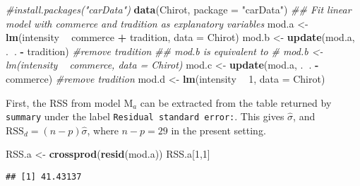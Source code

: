 \documentclass[]{book}
\newenvironment{Shaded}{\begin{snugshade}}{\end{snugshade}}
\newcommand{\CommentTok}[1]{\textcolor[rgb]{0.56,0.35,0.01}{\textit{#1}}}
\newcommand{\DataTypeTok}[1]{\textcolor[rgb]{0.13,0.29,0.53}{#1}}
\newcommand{\DecValTok}[1]{\textcolor[rgb]{0.00,0.00,0.81}{#1}}
\newcommand{\KeywordTok}[1]{\textcolor[rgb]{0.13,0.29,0.53}{\textbf{#1}}}
\newcommand{\NormalTok}[1]{#1}
\newcommand{\OperatorTok}[1]{\textcolor[rgb]{0.81,0.36,0.00}{\textbf{#1}}}
\newcommand{\StringTok}[1]{\textcolor[rgb]{0.31,0.60,0.02}{#1}}
\theoremstyle{definition}
\theoremstyle{definition}
\theoremstyle{definition}
\theoremstyle{remark}
\begin{document}
\begin{Shaded}
\begin{Highlighting}[]
\CommentTok{#install.packages("carData")}
\KeywordTok{data}\NormalTok{(Chirot, }\DataTypeTok{package =} \StringTok{"carData"}\NormalTok{)}
\CommentTok{## Fit linear model with commerce and tradition as explanatory variables}
\NormalTok{mod.a <-}\StringTok{ }\KeywordTok{lm}\NormalTok{(intensity }\OperatorTok{~}\StringTok{ }\NormalTok{commerce }\OperatorTok{+}\StringTok{ }\NormalTok{tradition, }\DataTypeTok{data =}\NormalTok{ Chirot)}
\NormalTok{mod.b <-}\StringTok{ }\KeywordTok{update}\NormalTok{(mod.a, .}\OperatorTok{~}\NormalTok{. }\OperatorTok{-}\StringTok{ }\NormalTok{tradition)  }\CommentTok{#remove tradition}
\CommentTok{## mod.b is equivalent to }
\CommentTok{# mod.b <- lm(intensity ~ commerce, data = Chirot)}
\NormalTok{mod.c <-}\StringTok{ }\KeywordTok{update}\NormalTok{(mod.a, .}\OperatorTok{~}\NormalTok{. }\OperatorTok{-}\StringTok{ }\NormalTok{commerce)  }\CommentTok{#remove tradition}
\NormalTok{mod.d <-}\StringTok{ }\KeywordTok{lm}\NormalTok{(intensity }\OperatorTok{~}\StringTok{ }\DecValTok{1}\NormalTok{, }\DataTypeTok{data =}\NormalTok{ Chirot)}
\end{Highlighting}
\end{Shaded}

First, the RSS from model \(\mathrm{M}_a\) can be extracted from the table returned by \texttt{summary} under the label \texttt{Residual\ standard\ error:}. This gives \(\widehat{\sigma}\), and \(\mathrm{RSS}_d = (n-p)\widehat{\sigma}\), where \(n-p=29\) in the present setting.

\begin{Shaded}
\begin{Highlighting}[]
\NormalTok{RSS.a <-}\StringTok{ }\KeywordTok{crossprod}\NormalTok{(}\KeywordTok{resid}\NormalTok{(mod.a))}
\NormalTok{RSS.a[}\DecValTok{1}\NormalTok{,}\DecValTok{1}\NormalTok{]}
\end{Highlighting}
\end{Shaded}

\begin{verbatim}
## [1] 41.43137
\end{verbatim}

\begin{Shaded}
\end{Shaded}
\end{document}
